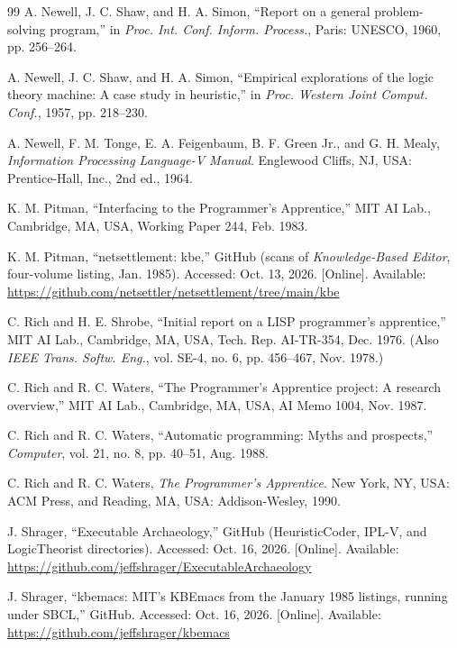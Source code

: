 \documentclass[11pt]{article}
\begin{document}
\begin{thebibliography}{99}
 A. Newell, J. C. Shaw, and H. A. Simon,
  ``Report on a general problem-solving program,'' in
  \textit{Proc. Int. Conf. Inform. Process.}, Paris: UNESCO, 1960,
  pp. 256--264.

 A. Newell, J. C. Shaw, and H. A. Simon, ``Empirical
  explorations of the logic theory machine: A case study in
  heuristic,'' in \textit{Proc. Western Joint Comput. Conf.}, 1957,
  pp. 218--230.

 A. Newell, F. M. Tonge, E. A. Feigenbaum,
  B. F. Green Jr., and G. H. Mealy,
  \textit{Information Processing Language-V Manual}. Englewood Cliffs,
  NJ, USA: Prentice-Hall, Inc., 2nd ed., 1964.

 K. M. Pitman, ``Interfacing to the Programmer's
  Apprentice,'' MIT AI Lab., Cambridge, MA, USA, Working Paper 244,
  Feb. 1983.

 K. M. Pitman, ``netsettlement: kbe,'' GitHub
  (scans of \textit{Knowledge-Based Editor}, four-volume listing,
  Jan. 1985). Accessed: Oct. 13, 2026. [Online]. Available:
  \url{https://github.com/netsettler/netsettlement/tree/main/kbe}

 C. Rich and H. E. Shrobe, ``Initial report on
  a LISP programmer's apprentice,'' MIT AI Lab., Cambridge, MA, USA,
  Tech. Rep. AI-TR-354, Dec. 1976. (Also \textit{IEEE Trans. Softw.
  Eng.}, vol. SE-4, no. 6, pp. 456--467, Nov. 1978.)

 C. Rich and R. C. Waters, ``The
  Programmer's Apprentice project: A research overview,'' MIT AI Lab.,
  Cambridge, MA, USA, AI Memo 1004, Nov. 1987.

 C. Rich and R. C. Waters, ``Automatic
  programming: Myths and prospects,'' \textit{Computer}, vol. 21, no. 8,
  pp. 40--51, Aug. 1988.

 C. Rich and R. C. Waters, \textit{The
  Programmer's Apprentice}. New York, NY, USA: ACM Press, and Reading,
  MA, USA: Addison-Wesley, 1990.

 J. Shrager, ``Executable Archaeology,'' GitHub
  (HeuristicCoder, IPL-V, and LogicTheorist directories). Accessed:
  Oct. 16, 2026. [Online]. Available:
  \url{https://github.com/jeffshrager/ExecutableArchaeology}

 J. Shrager, ``kbemacs: MIT's KBEmacs from the
  January 1985 listings, running under SBCL,'' GitHub. Accessed:
  Oct. 16, 2026. [Online]. Available:
  \url{https://github.com/jeffshrager/kbemacs}


\end{thebibliography}
\end{document}

